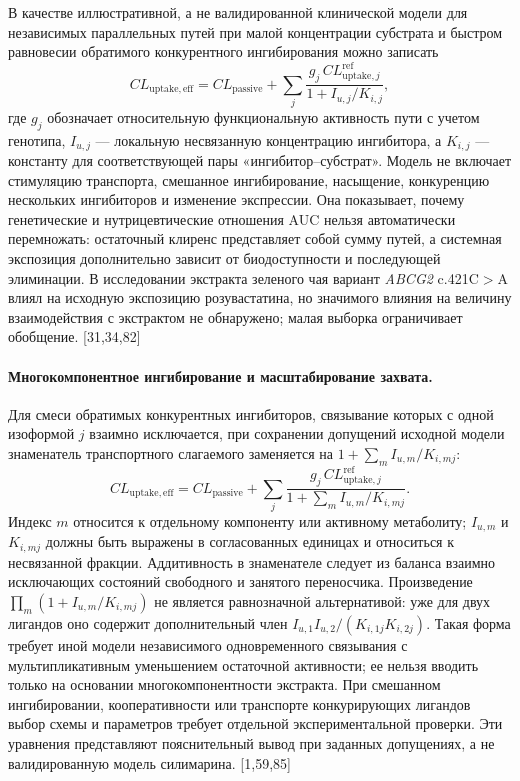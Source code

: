 \documentclass[11pt]{article}
\begin{document}
В качестве иллюстративной, а не валидированной клинической модели для независимых параллельных путей при малой концентрации субстрата и быстром равновесии обратимого конкурентного ингибирования можно записать
\[
CL_{\mathrm{uptake,eff}}=
CL_{\mathrm{passive}}+
\sum_j \frac{g_j\,CL_{\mathrm{uptake},j}^{\mathrm{ref}}}
{1+I_{u,j}/K_{i,j}},
\]
где \(g_j\) обозначает относительную функциональную активность пути с учетом генотипа, \(I_{u,j}\) --- локальную несвязанную концентрацию ингибитора, а \(K_{i,j}\) --- константу для соответствующей пары «ингибитор--субстрат». Модель не включает стимуляцию транспорта, смешанное ингибирование, насыщение, конкуренцию нескольких ингибиторов и изменение экспрессии. Она показывает, почему генетические и нутрицевтические отношения AUC нельзя автоматически перемножать: остаточный клиренс представляет собой сумму путей, а системная экспозиция дополнительно зависит от биодоступности и последующей элиминации. В исследовании экстракта зеленого чая вариант \textit{ABCG2} c.421C\(>\)A влиял на исходную экспозицию розувастатина, но значимого влияния на величину взаимодействия с экстрактом не обнаружено; малая выборка ограничивает обобщение. [31,34,82]

\paragraph{Многокомпонентное ингибирование и масштабирование захвата.}
Для смеси обратимых конкурентных ингибиторов, связывание которых с одной изоформой \(j\) взаимно исключается, при сохранении допущений исходной модели знаменатель транспортного слагаемого заменяется на \(1+\sum_m I_{u,m}/K_{i,mj}\):
\[
CL_{\mathrm{uptake,eff}}=
CL_{\mathrm{passive}}+
\sum_j\frac{g_j\,CL_{\mathrm{uptake},j}^{\mathrm{ref}}}
{1+\displaystyle\sum_m I_{u,m}/K_{i,mj}}.
\]
Индекс \(m\) относится к отдельному компоненту или активному метаболиту; \(I_{u,m}\) и \(K_{i,mj}\) должны быть выражены в согласованных единицах и относиться к несвязанной фракции. Аддитивность в знаменателе следует из баланса взаимно исключающих состояний свободного и занятого переносчика. Произведение \(\prod_m(1+I_{u,m}/K_{i,mj})\) не является равнозначной альтернативой: уже для двух лигандов оно содержит дополнительный член \(I_{u,1}I_{u,2}/(K_{i,1j}K_{i,2j})\). Такая форма требует иной модели независимого одновременного связывания с мультипликативным уменьшением остаточной активности; ее нельзя вводить только на основании многокомпонентности экстракта. При смешанном ингибировании, кооперативности или транспорте конкурирующих лигандов выбор схемы и параметров требует отдельной экспериментальной проверки. Эти уравнения представляют пояснительный вывод при заданных допущениях, а не валидированную модель силимарина. [1,59,85]
\end{document}
